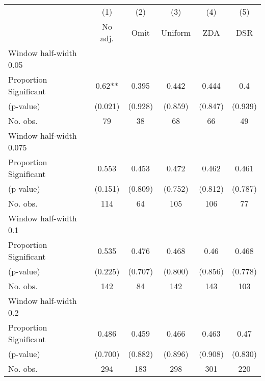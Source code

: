 
\def\sym#1{\ifmmode^{#1}\else\(^{#1}\)\fi}
\begin{tabular}{l*{5}{c}}
\hline\hline
& \multicolumn{1}{c}{(1)} &  \multicolumn{1}{c}{(2)} &  \multicolumn{1}{c}{(3)} &  \multicolumn{1}{c}{(4)} &  \multicolumn{1}{c}{(5)}\\
& \multicolumn{1}{c}{No adj.} &  \multicolumn{1}{c}{Omit} &  \multicolumn{1}{c}{Uniform} &  \multicolumn{1}{c}{ZDA} &  \multicolumn{1}{c}{DSR}\\

\hline
\hline
Window half-width 0.05\\

Proportion Significant& 0.62** &  0.395 &  0.442 &  0.444 &  0.4\\

(p-value) & (0.021) &  (0.928) &  (0.859) &  (0.847) &  (0.939)\\

No. obs.& 79 &  38 &  68 &  66 &  49\\

\hline
Window half-width 0.075\\

Proportion Significant& 0.553 &  0.453 &  0.472 &  0.462 &  0.461\\

(p-value) & (0.151) &  (0.809) &  (0.752) &  (0.812) &  (0.787)\\

No. obs.& 114 &  64 &  105 &  106 &  77\\

\hline
Window half-width 0.1\\

Proportion Significant& 0.535 &  0.476 &  0.468 &  0.46 &  0.468\\

(p-value) & (0.225) &  (0.707) &  (0.800) &  (0.856) &  (0.778)\\

No. obs.& 142 &  84 &  142 &  143 &  103\\

\hline
Window half-width 0.2\\

Proportion Significant& 0.486 &  0.459 &  0.466 &  0.463 &  0.47\\

(p-value) & (0.700) &  (0.882) &  (0.896) &  (0.908) &  (0.830)\\

No. obs.& 294 &  183 &  298 &  301 &  220\\


\end{tabular}
